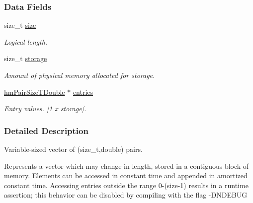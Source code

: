 \subsubsection*{Data Fields}
\begin{DoxyCompactItemize}
\item 
size\-\_\-t \hyperlink{structhm_vector_pair_size_t_double_a854352f53b148adc24983a58a1866d66}{size}
\begin{DoxyCompactList}\small\item\em Logical length. \end{DoxyCompactList}\item 
size\-\_\-t \hyperlink{structhm_vector_pair_size_t_double_ad69ae78713b41381c4d71371aae6e63e}{storage}
\begin{DoxyCompactList}\small\item\em Amount of physical memory allocated for storage. \end{DoxyCompactList}\item 
\hyperlink{structhm_pair_size_t_double}{hm\-Pair\-Size\-T\-Double} $\ast$ \hyperlink{structhm_vector_pair_size_t_double_abf41d9d474c700f3b5ca2400cf24801e}{entries}
\begin{DoxyCompactList}\small\item\em Entry values. \mbox{[}1 x storage\mbox{]}. \end{DoxyCompactList}\end{DoxyCompactItemize}


\subsubsection{Detailed Description}
Variable-\/sized vector of (size\-\_\-t,double) pairs. 

Represents a vector which may change in length, stored in a contiguous block of memory. Elements can be accessed in constant time and appended in amortized constant time. Accessing entries outside the range 0-\/(size-\/1) results in a runtime assertion; this behavior can be disabled by compiling with the flag -\/\-D\-N\-D\-E\-B\-U\-G 

